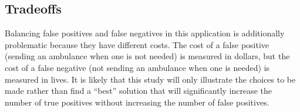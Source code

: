 \subsection{Tradeoffs}

Balancing false positives and false negatives in this application is additionally problematic because they have different costs.  The cost of a false positive (sending an ambulance when one is not needed) is measured in dollars, but the cost of a false negative (not sending an ambulance when one is needed) is measured in lives.  It is likely that this study will only illustrate the choices to be made rather than find a ``best'' solution that will significantly increase the number of true positives without increasing the number of false positives.  


